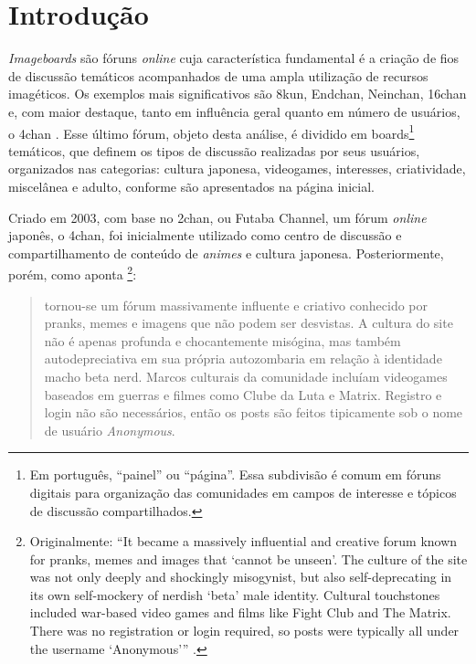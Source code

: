 \documentclass[portuguese]{textolivre}
\begin{document}
\begin{polyabstract}
\begin{english}
\begin{abstract}
\end{abstract}
\end{english}
\end{polyabstract}

\section{Introdução}

\emph{Imageboards} são fóruns \emph{online} cuja característica fundamental é a criação de fios de discussão temáticos acompanhados de uma ampla utilização de recursos imagéticos. Os exemplos mais significativos são 8kun, Endchan, Neinchan, 16chan e, com maior destaque, tanto em influência geral quanto em número de usuários, o 4chan \cite{baele2021variations}. Esse último fórum, objeto desta análise, é dividido em boards\footnote{Em português, “painel” ou “página”. Essa subdivisão é comum em fóruns digitais para organização das comunidades em campos de interesse e tópicos de discussão compartilhados.} temáticos, que definem os tipos de discussão realizadas por seus usuários, organizados nas categorias: cultura japonesa, videogames, interesses, criatividade, miscelânea e adulto, conforme são apresentados na página inicial.

Criado em 2003, com base no 2chan, ou Futaba Channel, um fórum \emph{online} japonês, o 4chan, foi inicialmente utilizado como centro de discussão e compartilhamento de conteúdo de \emph{animes} e cultura japonesa. Posteriormente, porém, como aponta \textcite[p. 21, tradução nossa]{nagle2017kill}\footnote{Originalmente: “It became a massively influential and creative forum known for pranks, memes and images that ‘cannot be unseen’. The culture of the site was not only deeply and shockingly misogynist, but also self-deprecating in its own self-mockery of nerdish ‘beta’ male identity. Cultural touchstones included war-based video games and films like Fight Club and The Matrix. There was no registration or login required, so posts were typically all under the username ‘Anonymous’” \cite[p. 21]{nagle2017kill}.}:

\begin{quote}
    tornou-se um fórum massivamente influente e criativo conhecido por pranks, memes e imagens que não podem ser desvistas. A cultura do site não é apenas profunda e chocantemente misógina, mas também autodepreciativa em sua própria autozombaria em relação à identidade macho beta nerd. Marcos culturais da comunidade incluíam videogames baseados em guerras e filmes como Clube da Luta e Matrix. Registro e login não são necessários, então os posts são feitos tipicamente sob o nome de usuário \emph{Anonymous}.
\end{quote}
\end{document}
